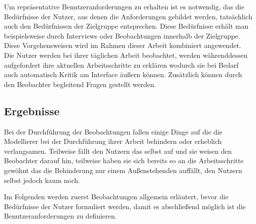 Um repräsentative Benutzeranforderungen zu erhalten ist es notwendig, das die Bedürfnisse der Nutzer, aus denen die Anforderungen gebildet werden, tatsächlich auch den Bedürfnissen der Zielgruppe entsprechen.
Diese Bedürfnisse erhält man beispielsweise durch Interviews oder Beobachtungen innerhalb der Zielgruppe.
Diese Vorgehensweisen wird im Rahmen dieser Arbeit kombiniert angewendet.
Die Nutzer werden bei ihrer täglichen Arbeit beobachtet, werden währenddessen aufgefordert ihre aktuellen Arbeitsschritte zu erklären wodurch sie bei Bedarf auch automatisch Kritik am Interface äußern können.
Zusätzlich können durch den Beobachter begleitend Fragen gestellt werden.

\subsection{Ergebnisse}

Bei der Durchführung der Beobachtungen fallen einige Dinge auf die die Modellierer bei der Durchführung ihrer Arbeit behindern oder erheblich verlangsamen.
Teilweise fällt den Nutzern das selbst auf und sie weisen den Beobachter darauf hin, teilweise haben sie sich bereits so an die Arbeitsschritte gewöhnt das die Behinderung nur einem Außenstehenden auffällt, den Nutzern selbst jedoch kaum noch.

Im Folgenden werden zuerst Beobachtungen allgemein erläutert, bevor die Bedürfnisse der Nutzer formuliert werden, damit es abschließend möglich ist die Benutzeranforderungen zu definieren.

